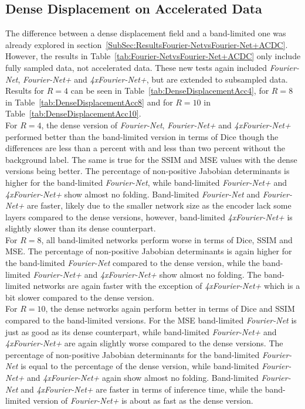 \documentclass[english,version-2022-01]{uzl-thesis} %
\begin{document}
\subsection{Dense Displacement on Accelerated Data} \label{SubSec:DenseDisplacementAcc}
The difference between a dense displacement field and a band-limited one was already explored in section~\ref{SubSec:ResultsFourier-NetvsFourier-Net+ACDC}. However, the results in Table~\ref{tab:Fourier-NetvsFourier-Net+ACDC} only include fully sampled data, not accelerated data. These new tests again included \emph{Fourier-Net}, \emph{Fourier-Net+} and \emph{4xFourier-Net+}, but are extended to subsampled data. Results for $R=4$ can be seen in Table~\ref{tab:DenseDisplacementAcc4}, for $R=8$ in Table~\ref{tab:DenseDisplacementAcc8} and for $R=10$ in Table~\ref{tab:DenseDisplacementAcc10}. \\
For $R=4$, the dense version of \emph{Fourier-Net}, \emph{Fourier-Net+} and \emph{4xFourier-Net+} performed better than the band-limited version in terms of Dice though the differences are less than a percent with and less than two percent without the background label. The same is true for the SSIM and MSE values with the dense versions being better. The percentage of non-positive Jabobian determinants is higher for the band-limited \emph{Fourier-Net}, while band-limited \emph{Fourier-Net+} and \emph{4xFourier-Net+} show almost no folding. 
Band-limited \emph{Fourier-Net} and \emph{Fourier-Net+} are faster, likely due to the smaller network size as the encoder lack some layers compared to the dense versions, however, band-limited \emph{4xFourier-Net+} is slightly slower than its dense counterpart.\\
For $R=8$, all band-limited networks perform worse in terms of Dice, SSIM and MSE. The percentage of non-positive Jabobian determinants is again higher for the band-limited \emph{Fourier-Net} compared to the dense version, while the band-limited \emph{Fourier-Net+} and \emph{4xFourier-Net+} show almost no folding. The band-limited networks are again faster with the exception of \emph{4xFourier-Net+} which is a bit slower compared to the dense version. \\
For $R=10$, the dense networks again perform better in terms of Dice and SSIM compared to the band-limited versions. For the MSE band-limited \emph{Fourier-Net} is just as good as its dense counterpart, while band-limited \emph{Fourier-Net+} and \emph{4xFourier-Net+} are again slightly worse compared to the dense versions. The percentage of non-positive Jabobian determinants for the band-limited \emph{Fourier-Net} is equal to the percentage of the dense version, while band-limited \emph{Fourier-Net+} and \emph{4xFourier-Net+} again show almost no folding. Band-limited \emph{Fourier-Net} and \emph{4xFourier-Net+} are faster in terms of inference time, while the band-limited version of \emph{Fourier-Net+} is about as fast as the dense version.\\
\end{document}
